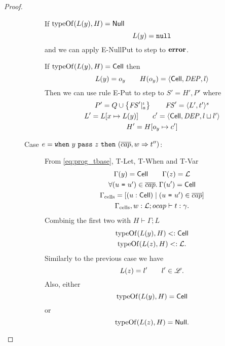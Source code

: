 \begin{proof}
\begin{description}
\begin{description}
          If $\mbox{$\mathrm{typeOf}$}(L(y), H) = \mbox{$\mathsf{Null}$}$
          \begin{equation*}
            L(y) = \mbox{\mdseries\texttt{null}}
          \end{equation*}
          and we can apply {\sc E-NullPut} to step to $\mbox{{\bf error}}$. \contradiction

          If $\mbox{$\mathrm{typeOf}$}(L(y), H) = \mbox{$\mathsf{Cell}$}$ then 
          \begin{equation*}
            L(y) = o_y \quad\quad H(o_y) = \mbox{$\langle \mbox{$\mathsf{Cell}$}{}, \mathit{DEP}, l \rangle$}
          \end{equation*}
          Then we can use rule {\sc E-Put} to step to $S' = H', P'$ where 
          \begin{equation*}
            \begin{gathered}
              P' = Q \cup \left\{\mathit{FS}'|_a^\iota \right\} \quad\quad \mathit{FS}' = \mbox{$\langle L',
              t' \rangle^s$} \\
              L' = L[x \mapsto L(y)] \quad\quad c' = \mbox{$\langle \mbox{$\mathsf{Cell}$}{}, \mathit{DEP}, l \sqcup l' \rangle$} \\
              H' = H[o_y \mapsto c']
            \end{gathered}
          \end{equation*}
          \contradiction

        \item[Case $e = \mbox{\mdseries\texttt{when}~$y$~\texttt{pass}~$z$~\texttt{then}~$(\overline{cap}, w \Rightarrow t'')$}$:]
          From \eqref{eq:prog_tbase}, {\sc T-Let}, {\sc T-When} and {\sc T-Var}
          \begin{equation*}
            \begin{gathered}
              \Gamma(y) = \mbox{$\mathsf{Cell}$} \quad\quad \Gamma(z) = \mbox{$\mathcal{L}$} \\
              \forall(\mbox{\mdseries$u$~\texttt{=}~$u'$}) \in \overline{cap}. \: \Gamma(u') = \mbox{$\mathsf{Cell}$} \\
              \Gamma_{\text{cells}} = [(u: \mbox{$\mathsf{Cell}$}) \mid (\mbox{\mdseries$u$~\texttt{=}~$u'$}) \in
              \overline{cap}] \\
              \mbox{$\Gamma_{\text{cells}}, w: \mbox{$\mathcal{L}$};\mbox{$ocap$}\vdash t:\gamma$}.
            \end{gathered}
          \end{equation*}
          Combinig the first two with $H \vdash \Gamma;L$
          \begin{gather*}
            \mbox{$\mathrm{typeOf}$}(L(y), H) <: \mbox{$\mathsf{Cell}$} \\
            \mbox{$\mathrm{typeOf}$}(L(z), H) <: \mbox{$\mathcal{L}$}.
          \end{gather*}
          Similarly to the previous case we have
          \begin{equation*}
            L(z) = l' \quad\quad l' \in \mbox{$\mathscr{L}$}.
          \end{equation*}
          Also, either
          \begin{equation*}
            \mbox{$\mathrm{typeOf}$}(L(y), H) = \mbox{$\mathsf{Cell}$}
          \end{equation*}
          or
          \begin{equation*}
            \mbox{$\mathrm{typeOf}$}(L(z), H) = \mbox{$\mathsf{Null}$}.
          \end{equation*}


\end{description}
\end{description}
\end{proof}
